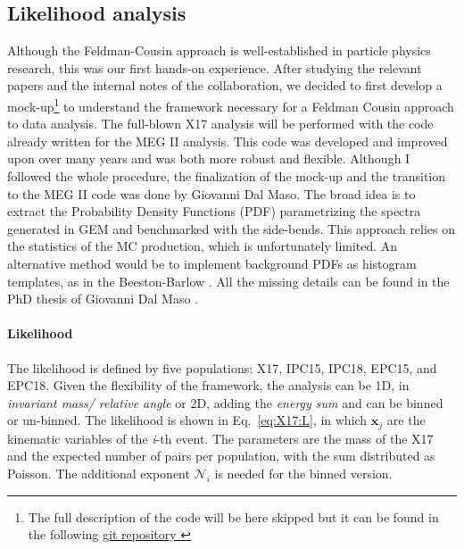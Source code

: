 \begin{refsection}
    \subsection{Likelihood analysis}
    \label{sec:X17:likelihood}
        Although the Feldman-Cousin approach is well-established in particle physics research, this was our first hands-on experience. 
        After studying the relevant papers \cite{feldman:1998}\cite{feldman:2011} and the internal notes of the collaboration, we decided to first develop a mock-up\footnote{The full description of the code will be here skipped but it can be found in the following         \href{https://github.com/gdalmaso96/X17_LL_mock_up}{\underline{git repository \faGithubSquare}}} to understand the framework necessary for a Feldman Cousin approach to data analysis.  
        The full-blown X17 analysis will be performed with the code already written for the MEG II analysis. 
        This code was developed and improved upon over many years and was both more robust and flexible. 
        Although I followed the whole procedure, the finalization of the mock-up and the transition to the MEG II code was done by Giovanni Dal Maso. 
        The broad idea is to extract the Probability Density Functions (PDF) parametrizing the spectra generated in GEM and benchmarked with the side-bends.
        This approach relies on the statistics of the MC production, which is unfortunately limited.
        An alternative method would be to implement background PDFs as histogram templates, as in the Beeston-Barlow \cite{X17:likelihood:BB}.
        All the missing details can be found in the PhD thesis of Giovanni Dal Maso \cite{Giovanni}.

        \paragraph{Likelihood}
        The likelihood is defined by five populations: X17, IPC15, IPC18, EPC15, and EPC18.
        Given the flexibility of the framework, the analysis can be 1D, in \textit{invariant mass/ relative angle} or 2D, adding the \textit{energy sum} and can be binned or un-binned.
        The likelihood is shown in Eq.~\ref{eq:X17:L}, in which $\textbf{x}_j$ are the kinematic variables of the \textit{i}-th event.
        The parameters are the mass of the X17 and the expected number of pairs per population, with the sum distributed as Poisson.
        The additional exponent $\mathcal{N}_i$ is needed for the binned version.
        

\end{refsection}
